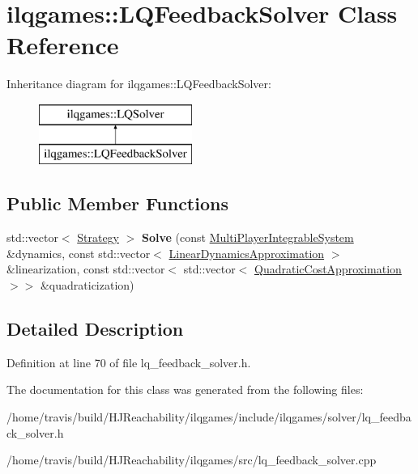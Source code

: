 \hypertarget{classilqgames_1_1_l_q_feedback_solver}{}\section{ilqgames\+:\+:L\+Q\+Feedback\+Solver Class Reference}
\label{classilqgames_1_1_l_q_feedback_solver}
Inheritance diagram for ilqgames\+:\+:L\+Q\+Feedback\+Solver\+:\begin{figure}[H]
\begin{center}
\leavevmode
\includegraphics[height=2.000000cm]{classilqgames_1_1_l_q_feedback_solver}
\end{center}
\end{figure}
\subsection*{Public Member Functions}
\begin{DoxyCompactItemize}
\item 
std\+::vector$<$ \hyperlink{structilqgames_1_1_strategy}{Strategy} $>$ {\bfseries Solve} (const \hyperlink{classilqgames_1_1_multi_player_integrable_system}{Multi\+Player\+Integrable\+System} \&dynamics, const std\+::vector$<$ \hyperlink{structilqgames_1_1_linear_dynamics_approximation}{Linear\+Dynamics\+Approximation} $>$ \&linearization, const std\+::vector$<$ std\+::vector$<$ \hyperlink{structilqgames_1_1_quadratic_cost_approximation}{Quadratic\+Cost\+Approximation} $>$$>$ \&quadraticization)\hypertarget{classilqgames_1_1_l_q_feedback_solver_a89c6e5a9980757fa0556fed3c485996f}{}\label{classilqgames_1_1_l_q_feedback_solver_a89c6e5a9980757fa0556fed3c485996f}

\end{DoxyCompactItemize}


\subsection{Detailed Description}


Definition at line 70 of file lq\+\_\+feedback\+\_\+solver.\+h.



The documentation for this class was generated from the following files\+:\begin{DoxyCompactItemize}
\item 
/home/travis/build/\+H\+J\+Reachability/ilqgames/include/ilqgames/solver/lq\+\_\+feedback\+\_\+solver.\+h\item 
/home/travis/build/\+H\+J\+Reachability/ilqgames/src/lq\+\_\+feedback\+\_\+solver.\+cpp\end{DoxyCompactItemize}
